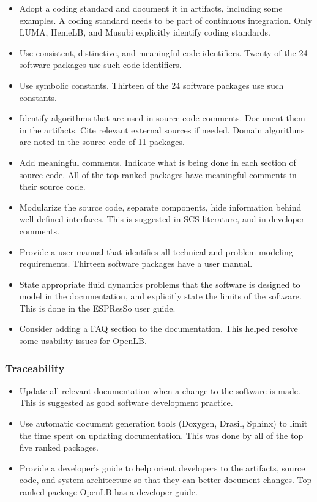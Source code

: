 \documentclass[final, 3p, times, authoryear]{elsarticle}
\begin{document}
\begin{itemize}
	\item Adopt a coding standard and document it in artifacts, including some examples. A coding standard needs to be part of continuous integration. Only
	LUMA, HemeLB, and Musubi explicitly identify coding standards. 
	\item Use consistent, distinctive, and meaningful code identifiers. Twenty of the 24 software packages use such code identifiers.
	\item Use symbolic constants. Thirteen of the 24 software packages use such constants.
	\item Identify algorithms that are used in source code comments. Document them in the artifacts. Cite relevant external sources if needed. Domain algorithms are noted in the source code of 11 packages.
	\item Add meaningful comments. Indicate what is being done in each section of source code. All of the top ranked packages have meaningful comments in their source code.
	\item Modularize the source code, separate components, hide information behind well defined interfaces. This is suggested in SCS literature, and in developer comments.
	\item Provide a user manual that identifies all technical and problem modeling requirements. Thirteen software packages have a user manual.
	\item State appropriate fluid dynamics problems that the software is designed to model in the documentation, and explicitly state the limits of the software. This is done in the ESPResSo user guide. 
	\item Consider adding a FAQ section to the documentation. This helped resolve some usability issues for OpenLB.
\end{itemize}

\subsubsection{Traceability}

\begin{itemize}
	\item Update all relevant documentation when a change to the software is made. This is suggested as good software development practice.
	\item Use automatic document generation tools (Doxygen, Drasil, Sphinx) to limit the time spent on updating documentation. This was done by all of the top five ranked packages.
	\item Provide a developer's guide to help orient developers to the artifacts, source code, and system architecture so that they can better document changes. Top ranked package OpenLB has a developer guide. 
\end{itemize}
\end{document}
